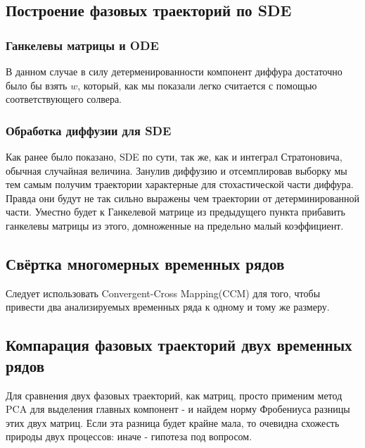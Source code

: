 \documentclass{article}
\begin{document}
   \subsection{Построение фазовых траекторий по SDE}

       \subsubsection{Ганкелевы матрицы и ODE}
            \par В данном случае в силу детерменированности компонент диффура достаточно было бы взять $w$, который, как мы показали легко считается с помощью соответствующего солвера.

       \subsubsection{Обработка диффузии для SDE}
            \par Как ранее было показано, SDE по сути, так же, как и интеграл Стратоновича, обычная случайная величина. Занулив диффузию и отсемплировав выборку мы тем самым получим траектории характерные для стохастической части диффура. Правда они будут не так сильно выражены чем траектории от детерминированной части. Уместно будет к Ганкелевой матрице из предыдущего пункта прибавить ганкелевы матрицы из этого, домноженные на предельно малый коэффициент.

   \subsection{Свёртка многомерных временных рядов}
       \par Следует использовать Convergent-Cross Mapping(CCM) для того, чтобы привести два анализируемых временных ряда к одному и тому же размеру. 

   \subsection{Компарация фазовых траекторий двух временных рядов}

   \par Для сравнения двух фазовых траекторий, как матриц, просто применим метод PCA для выделения главных компонент - и найдем норму Фробениуса разницы этих двух матриц. Если эта разница будет крайне мала, то очевидна схожесть природы двух процессов: иначе - гипотеза под вопросом.



\end{document}

